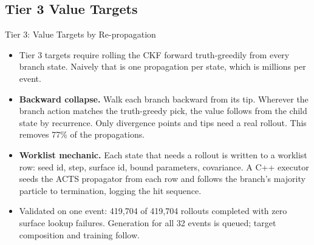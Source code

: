 \documentclass[aspectratio=169]{beamer}
\begin{document}
\subsection{Tier 3 Value Targets}

\begin{frame}{Tier 3: Value Targets by Re-propagation}
  \begin{itemize}
    \item Tier 3 targets require rolling the CKF forward truth-greedily from
      every branch state. Naively that is one propagation per state, which is
      millions per event.
    \item \textbf{Backward collapse.} Walk each branch backward from its tip.
      Wherever the branch action matches the truth-greedy pick, the value
      follows from the child state by recurrence. Only divergence points and
      tips need a real rollout. This removes 77\% of the propagations.
    \item \textbf{Worklist mechanic.} Each state that needs a rollout is
      written to a worklist row: seed id, step, surface id, bound parameters,
      covariance. A C++ executor seeds the ACTS propagator from each row and
      follows the branch's majority particle to termination, logging the hit
      sequence.
    \item Validated on one event: 419{,}704 of 419{,}704 rollouts completed
      with zero surface lookup failures. Generation for all 32 events is
      queued; target composition and training follow.
  \end{itemize}
\end{frame}
\end{document}
